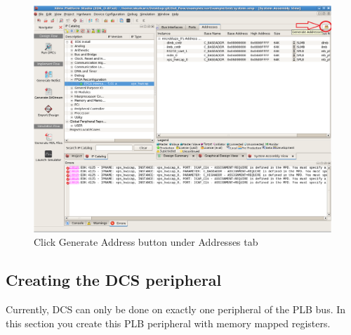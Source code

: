 \documentclass[a4paper,oneside]{memoir}
\begin{document}
\begin{figure}[H]
\centering
\includegraphics[scale=0.4]{step11}
\caption{Click Generate Address button under Addresses tab\label{fig:step11}}
\end{figure}

\subsection{Creating the DCS peripheral}\label{sec:creating_peripheral_blaze}
Currently, DCS can only be done on exactly one peripheral of the PLB bus. In this section you create this PLB peripheral with memory mapped registers.
\end{document}
